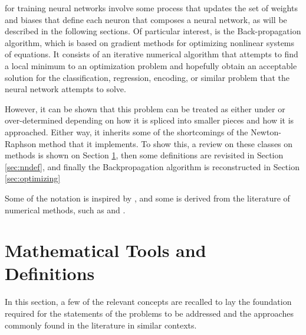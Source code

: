 \documentclass[10pt,journal,compsoc]{IEEEtran}
\newcommand{\cs}[1]{Section \ref{#1}}
\begin{document}
%
\IEEEpeerreviewmaketitle




 for training neural networks involve some process that updates the set of weights and biases that define each neuron that composes a neural network, as will be described in the following sections. Of particular interest, is the Back-propagation algorithm, which is based on gradient methods for optimizing nonlinear systems of equations. It consists of an iterative numerical algorithm that attempts to find a local minimum to an optimization problem and hopefully obtain an acceptable solution for the classification, regression, encoding, or similar problem that the neural network attempts to solve.

However, it can be shown that this problem can be treated as either under or over-determined depending on how it is spliced into smaller pieces and how it is approached. Either way, it inherits some of the shortcomings of the Newton-Raphson method that it implements. To show this, a review on these classes on methods is shown on \cs{sec:mathtools}, then some definitions are revisited in \cs{sec:nndef}, and finally the Backpropagation algorithm is reconstructed in \cs{sec:optimizing}

Some of the notation is inspired by \cite{haykin2010neural}, and some is derived from the literature of numerical methods, such as \cite{carnahan1969applied} and \cite{press1988numerical}.

\section{Mathematical Tools and Definitions}\label{sec:mathtools}

In this section, a few of the relevant concepts are recalled to lay the foundation required for the statements of the problems to be addressed and the approaches commonly found in the literature in similar contexts.
\end{document}
